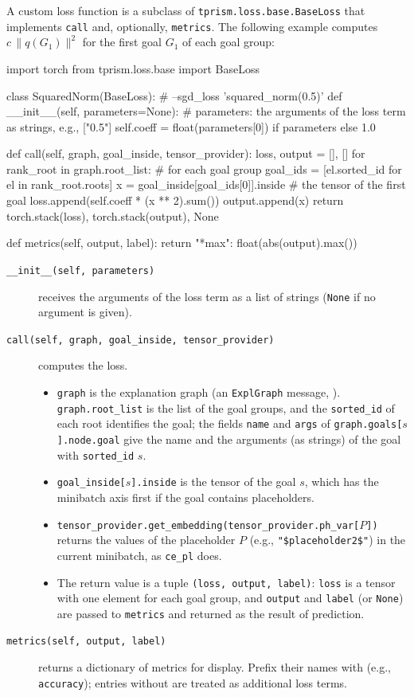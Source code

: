 \documentclass[a4paper]{report}
\begin{document}
A custom loss function is a subclass of {\tt tprism.loss.base.BaseLoss}
that implements {\tt call} and, optionally, {\tt metrics}.  The following
example computes $c\,\|q(G_1)\|^2$ for the first goal $G_1$ of each goal group:
\begin{pythoncode}
import torch
from tprism.loss.base import BaseLoss

class SquaredNorm(BaseLoss):                  # --sgd_loss 'squared_norm(0.5)'
    def __init__(self, parameters=None):
        # parameters: the arguments of the loss term as strings, e.g., ["0.5"]
        self.coeff = float(parameters[0]) if parameters else 1.0

    def call(self, graph, goal_inside, tensor_provider):
        loss, output = [], []
        for rank_root in graph.root_list:     # for each goal group
            goal_ids = [el.sorted_id for el in rank_root.roots]
            x = goal_inside[goal_ids[0]].inside   # the tensor of the first goal
            loss.append(self.coeff * (x ** 2).sum())
            output.append(x)
        return torch.stack(loss), torch.stack(output), None

    def metrics(self, output, label):
        return {"*max": float(abs(output).max())}
\end{pythoncode}
\begin{description}
	\item[{\tt \_\_init\_\_(self, parameters)}] receives the arguments of the
	loss term as a list of strings ({\tt None} if no argument is given).
	\item[{\tt call(self, graph, goal\_inside, tensor\_provider)}] computes the loss.
	\begin{itemize}
		\item {\tt graph} is the explanation graph (an {\tt ExplGraph} message,
		).  {\tt graph.root\_list} is the list of the goal
		groups, and the {\tt sorted\_id} of each root identifies the goal;
		the fields {\tt name} and {\tt args} of {\tt graph.goals[$s$].node.goal}
		give the name and the arguments (as strings) of the goal with {\tt sorted\_id} $s$.
		\item {\tt goal\_inside[$s$].inside} is the tensor of the goal $s$, which
		has the minibatch axis first if the goal contains placeholders.
		\item {\tt tensor\_provider.get\_embedding(tensor\_provider.ph\_var[$P$])}
		returns the values of the placeholder $P$ (e.g., {\tt "\$placeholder2\$"})
		in the current minibatch, as {\tt ce\_pl} does.
		\item The return value is a tuple {\tt (loss, output, label)}: {\tt loss}
		is a tensor with one element for each goal group, and {\tt output} and
		{\tt label} (or {\tt None}) are passed to {\tt metrics} and returned as
		the result of prediction.
	\end{itemize}
	\item[{\tt metrics(self, output, label)}] returns a dictionary of metrics
	for display.  Prefix their names with {\tt *} (e.g., {\tt *accuracy});
	entries without {\tt *} are treated as additional loss terms.
\end{description}
\end{document}
